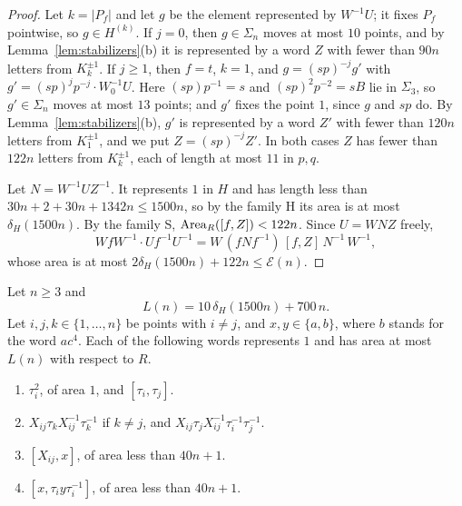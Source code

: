\begin{proof}
Let $k=|P_f|$ and let $g$ be the element represented by $W^{-1}U$; it fixes $P_f$ pointwise, so $g\in H^{(k)}$. If $j=0$, then $g\in\Sigma_n$ moves at
most $10$ points, and by Lemma~\ref{lem:stabilizers}(b) it is represented by a word $Z$ with fewer than $90n$ letters from $K_k^{\pm1}$. If
$j\ge1$, then $f=t$, $k=1$, and $g=(sp)^{-j}g'$ with $g'=(sp)^jp^{-j}\cdot W_0^{-1}U$. Here $(sp)p^{-1}=s$ and $(sp)^2p^{-2}=sB$ lie in
$\Sigma_3$, so $g'\in\Sigma_n$ moves at most $13$ points; and $g'$ fixes the point $1$, since $g$ and $sp$ do. By Lemma~\ref{lem:stabilizers}(b),
$g'$ is represented by a word $Z'$ with fewer than $120n$ letters from $K_1^{\pm1}$, and we put $Z=(sp)^{-j}Z'$. In both cases $Z$ has fewer than
$122n$ letters from $K_k^{\pm1}$, each of length at most $11$ in $p,q$.

Let $N=W^{-1}UZ^{-1}$. It represents $1$ in $H$ and has length less than $30n+2+30n+1342n\le1500n$, so by the family \textsf{H} its area is at
most $\delta_H(1500n)$. By the family \textsf{S}, $\operatorname{Area}_R([f,Z])<122n$. Since $U=WNZ$ freely,
\[
WfW^{-1}\cdot Uf^{-1}U^{-1}=W\,(fNf^{-1})\,[f,Z]\,N^{-1}\,W^{-1},
\]
whose area is at most $2\delta_H(1500n)+122n\le\mathcal E(n)$.
\end{proof}

\begin{lemma}\label{lem:local-filling}
Let $n\ge3$ and
\[
L(n)=10\,\delta_H(1500n)+700\,n .
\]
Let $i,j,k\in\{1,\dots,n\}$ be points with $i\ne j$, and $x,y\in\{a,b\}$, where $b$ stands for the word $ac^4$. Each of the following words
represents $1$ and has area at most $L(n)$ with respect to $R$.
\begin{enumerate}[label=(\alph*),itemsep=1pt]
\item $\tau_i^2$, of area $1$, and $[\tau_i,\tau_j]$.
\item $X_{ij}\tau_kX_{ij}^{-1}\tau_k^{-1}$ if $k\ne j$, and $X_{ij}\tau_jX_{ij}^{-1}\tau_i^{-1}\tau_j^{-1}$.
\item $[X_{ij},x]$, of area less than $40n+1$.
\item $[x,\tau_iy\tau_i^{-1}]$, of area less than $40n+1$.
\end{enumerate}
\end{lemma}

